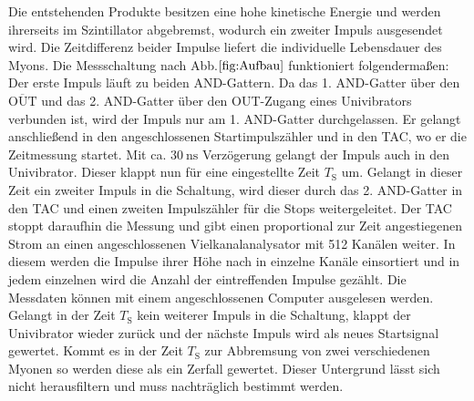     Die entstehenden Produkte besitzen eine hohe kinetische Energie und werden ihrerseits im Szintillator abgebremst, wodurch ein zweiter Impuls ausgesendet wird. Die Zeitdifferenz beider Impulse liefert die individuelle Lebensdauer des Myons. Die Messschaltung nach Abb.$ \ref{fig:Aufbau}$ funktioniert folgendermaßen:
    Der erste Impuls läuft zu beiden AND-Gattern. Da das 1. AND-Gatter über den $\overline{\text{OUT}}$  und das 2. AND-Gatter über den OUT-Zugang eines Univibrators verbunden ist, wird der Impuls nur am 1. AND-Gatter durchgelassen. Er gelangt anschließend in den angeschlossenen Startimpulszähler und in den TAC, wo er die Zeitmessung startet. Mit ca. $\SI{30}{\nano\second}$ Verzögerung gelangt der Impuls auch in den Univibrator. Dieser klappt nun für eine eingestellte Zeit $T_\text{S}$ um. Gelangt in dieser Zeit ein zweiter Impuls in die Schaltung, wird dieser durch das 2. AND-Gatter in den TAC und einen zweiten Impulszähler für die Stops weitergeleitet. Der TAC stoppt daraufhin die Messung und gibt einen proportional zur Zeit angestiegenen Strom an einen angeschlossenen Vielkanalanalysator mit 512 Kanälen weiter. In diesem werden die Impulse ihrer Höhe nach in einzelne Kanäle einsortiert und in jedem einzelnen wird die Anzahl der eintreffenden Impulse gezählt. Die Messdaten können mit einem angeschlossenen Computer ausgelesen werden. Gelangt in der Zeit $T_\text{S}$ kein weiterer Impuls in die Schaltung, klappt der Univibrator wieder zurück und der nächste Impuls wird als neues Startsignal gewertet. Kommt es in der Zeit $T_\text{S}$ zur Abbremsung von zwei verschiedenen Myonen so werden diese als ein Zerfall gewertet. Dieser Untergrund lässt sich nicht herausfiltern und muss nachträglich bestimmt werden.